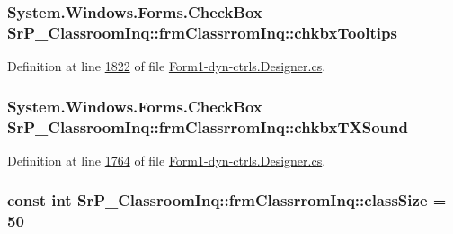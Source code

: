 \hypertarget{class_sr_p___classroom_inq_1_1frm_classrrom_inq_a1952935fe5b823dcc597f5aafd7436aa}{
\subsubsection[{chkbx\-Tooltips}]{\setlength{\rightskip}{0pt plus 5cm}\-System.\-Windows.\-Forms.\-Check\-Box {\bf \-Sr\-P\-\_\-\-Classroom\-Inq\-::frm\-Classrrom\-Inq\-::chkbx\-Tooltips}}}
\label{class_sr_p___classroom_inq_1_1frm_classrrom_inq_a1952935fe5b823dcc597f5aafd7436aa}


\-Definition at line \hyperlink{_form1-dyn-ctrls_8_designer_8cs_source_l01822}{1822} of file \hyperlink{_form1-dyn-ctrls_8_designer_8cs_source}{\-Form1-\/dyn-\/ctrls.\-Designer.\-cs}.

\hypertarget{class_sr_p___classroom_inq_1_1frm_classrrom_inq_a63062a732e40b85f40aa3ba57d80223a}{
\subsubsection[{chkbx\-T\-X\-Sound}]{\setlength{\rightskip}{0pt plus 5cm}\-System.\-Windows.\-Forms.\-Check\-Box {\bf \-Sr\-P\-\_\-\-Classroom\-Inq\-::frm\-Classrrom\-Inq\-::chkbx\-T\-X\-Sound}}}
\label{class_sr_p___classroom_inq_1_1frm_classrrom_inq_a63062a732e40b85f40aa3ba57d80223a}


\-Definition at line \hyperlink{_form1-dyn-ctrls_8_designer_8cs_source_l01764}{1764} of file \hyperlink{_form1-dyn-ctrls_8_designer_8cs_source}{\-Form1-\/dyn-\/ctrls.\-Designer.\-cs}.

\hypertarget{class_sr_p___classroom_inq_1_1frm_classrrom_inq_a78d9aab335edfe53d39036b9d89928a8}{
\subsubsection[{class\-Size}]{\setlength{\rightskip}{0pt plus 5cm}const int {\bf \-Sr\-P\-\_\-\-Classroom\-Inq\-::frm\-Classrrom\-Inq\-::class\-Size} = 50}}
\label{class_sr_p___classroom_inq_1_1frm_classrrom_inq_a78d9aab335edfe53d39036b9d89928a8}


